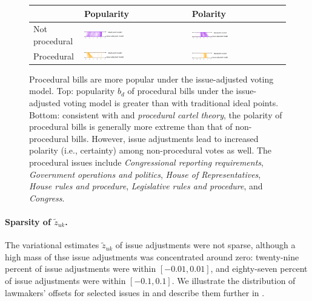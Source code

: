 \begin{figure}
  \begin{tabular}{|m{0.85in}|m{2.54in}|m{2.54in}|}
    \hline
    & Popularity & Polarity \\
    \hline
    Not procedural &
    \includegraphics[width=0.4\textwidth]{chapter_spatial_voting_with_text/figures/3398_noprocedural_popularity.pdf} &
    \includegraphics[width=0.4\textwidth]{chapter_spatial_voting_with_text/figures/3398_noprocedural_polarity.pdf} \\
    Procedural &
    \includegraphics[width=0.4\textwidth]{chapter_spatial_voting_with_text/figures/3398_procedural_popularity.pdf} &
    \includegraphics[width=0.4\textwidth]{chapter_spatial_voting_with_text/figures/3398_procedural_polarity.pdf} \\
    \hline
  \end{tabular}
  \caption{Procedural bills are more popular under the issue-adjusted
    voting model. Top: popularity $b_d$ of procedural bills under the
    issue-adjusted voting model is greater than with traditional ideal
    points.  Bottom: consistent with \citet{cox:2002} and
    \emph{procedural cartel theory}, the polarity of procedural bills
    is generally more extreme than that of non-procedural bills.
    However, issue adjustments lead to increased polarity (i.e.,
    certainty) among non-procedural votes as well.  The procedural
    issues include \emph{Congressional reporting requirements},
    \emph{Government operations and politics}, \emph{House of
      Representatives}, \emph{House rules and procedure},
    \emph{Legislative rules and procedure}, and \emph{Congress}.}
  \label{fig:bills_parameter_changes}
\end{figure}

\paragraph{Sparsity of $\tilde z_{uk}$.}
The variational estimates $\tilde z_{uk}$ of issue adjustments were
not sparse, although a high mass of thse issue adjustments was
concentrated around zero: twenty-nine percent of issue adjustments
were within $[-0.01, 0.01]$, and eighty-seven percent of issue
adjustments were within $[-0.1, 0.1]$.  We illustrate the distribution
of lawmakers' offsets for selected issues in
 and describe them further in
.

